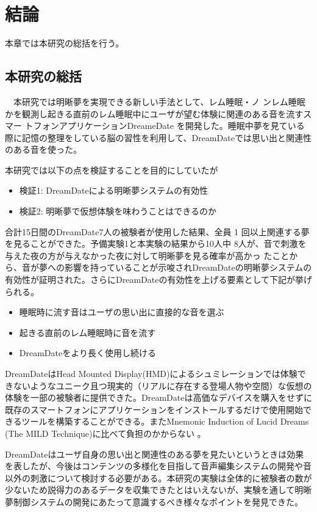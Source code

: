 \chapter{結論}
\label{chap:coding}

本章では本研究の総括を行う。
\section{本研究の総括}
　本研究では明晰夢を実現できる新しい手法として、レム睡眠・ノ ンレム睡眠かを観測し起きる直前のレム睡眠中にユーザが望む体験に関連のある音を流すスマー トフォンアプリケーションDreameDate を開発した。睡眠中夢を見ている際に記憶の整理をしている脳の習性を利用して、DreamDateでは思い出と関連性のある音を使った。

本研究では以下の点を検証することを目的にしていたが
\begin{itemize}
\item 検証1: DreamDateによる明晰夢システムの有効性
\item 検証2: 明晰夢で仮想体験を味わうことはできるのか
\end{itemize}

合計15日間のDreamDate7人の被験者が使用した結果、全員 1 回以上関連する夢を見ることができた。予備実験1と本実験の結果から10人中 8人が、音で刺激を与えた夜の方が与えなかった夜に対して明晰夢を見る確率が高かっ たことから、音が夢への影響を持っていることが示唆されDreamDateの明晰夢システムの有効性が証明された。さらにDreamDateの有効性を上げる要素として下記が挙げられる。
\begin{itemize}
\item 睡眠時に流す音はユーザの思い出に直接的な音を選ぶ
\item 起きる直前のレム睡眠時に音を流す
\item DreamDateをより長く使用し続ける
\end{itemize}

DreamDateはHead Mounted Display(HMD)によるシュミレーションでは体験できないようなユニーク且つ現実的（リアルに存在する登場人物や空間）な仮想の体験を一部の被験者に提供できた。DreamDateは高価なデバイスを購入をせずに既存のスマートフォンにアプリケーションをインストールするだけで使用開始できるツールを構築することができる。またMnemonic Induction of Lucid Dreams (The MILD Technique)に比べて負担のかからない\cite{LaBerge} 。

DreamDateはユーザ自身の思い出と関連性のある夢を見たいというときは効果を表したが、今後はコンテンツの多様化を目指して音声編集システムの開発や音以外の刺激について検討する必要がある。本研究の実験は全体的に被験者の数が少ないため説得力のあるデータを収集できたとはいえないが、実験を通して明晰夢制御システムの開発にあたって意識するべき様々なポイントを発見できた。

